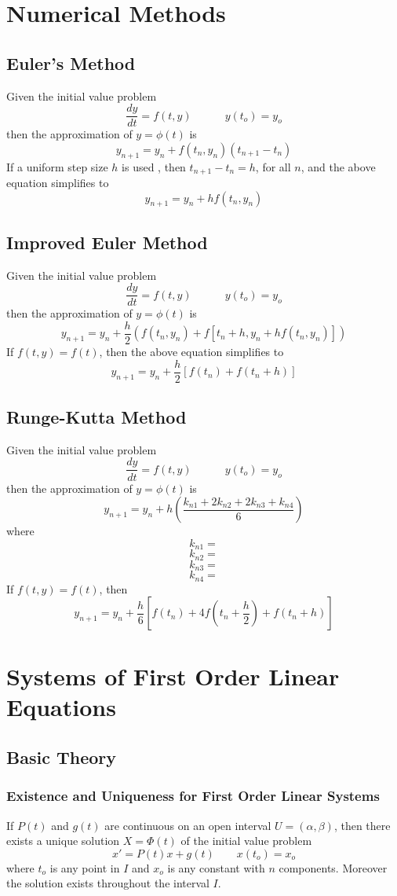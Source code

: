 \documentclass[11pt]{article}
\begin{document}
\pagebreak

\section{Numerical Methods}
\subsection{Euler's Method}
Given the initial value problem
$$ \frac{dy}{dt} = f(t,y) \quad \quad \quad y(t_o) = y_o $$ then the approximation of $y= \phi (t)$ is 
$$ y_{n+1} = y_n + f(t_n, y_n)(t_{n+1} - t_n) $$
If a uniform step size $h$ is used , then $t_{n+1} - t_n = h$, for all $n$, and the above equation simplifies to
$$y_{n+1} = y_n + hf(t_n, y_n)$$

\subsection{Improved Euler Method}
Given the initial value problem
$$ \frac{dy}{dt} = f(t,y) \quad \quad \quad y(t_o) = y_o $$ then the approximation of $y= \phi (t)$ is 
$$ y_{n+1} = y_n + \frac{h}{2} \left( f(t_n, y_n)+ f[t_n + h, y_n + hf(t_n, y_n)] \right) $$
If $f(t,y) = f(t)$, then the above equation simplifies to
$$y_{n+1} = y_n + \frac{h}{2} [f(t_n) + f(t_n + h)] $$
\subsection{Runge-Kutta Method}
Given the initial value problem
$$ \frac{dy}{dt} = f(t,y) \quad \quad \quad y(t_o) = y_o $$ then the approximation of $y= \phi (t)$ is
$$ y_{n+1} = y_n + h \left( \frac{k_{n1} + 2k_{n2} + 2k_{n3} + k_{n4}}{6}\right)$$
where
$$ k_{n1} = $$ 
$$ k_{n2} = $$
$$ k_{n3} = $$
$$ k_{n4} = $$
If $f(t,y) = f(t)$, then $$y_{n+1} = y_n + \frac{h}{6}\left[f(t_n) + 4f\left(t_n + \frac{h}{2}\right) + f(t_n + h)\right]$$

\pagebreak

\section{Systems of First Order Linear Equations}
\subsection{Basic Theory}
\subsubsection{Existence and Uniqueness for First Order Linear Systems}
If $P(t)$ and $g(t)$ are continuous on an open interval $U = (\alpha, \beta)$, then there exists a unique solution $X = \Phi (t)$ of the initial value problem 
$$ x' = P(t)x + g(t) \quad \quad	x(t_o) = x_o$$
where $t_o$ is any point in $I$ and $x_o$ is any constant with $n$ components. Moreover the solution exists throughout the interval $I$.
\end{document}
